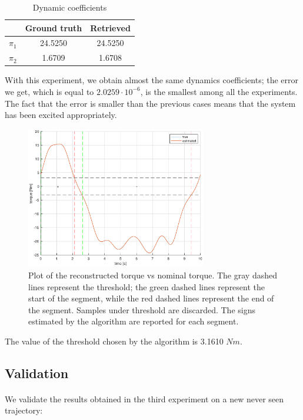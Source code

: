 \documentclass{article}
\begin{document}
\begin{table}[!htbp]
\centering
\begin{tabular}{|c|cc|}
\hline
& Ground truth & Retrieved\\
\hline
$\pi_1$ & 24.5250 & 24.5250\\ 
$\pi_2$ & 1.6709 & 1.6708\\
\hline
\end{tabular}
\caption{Dynamic coefficients}
\end{table}
\FloatBarrier

With this experiment, we obtain almost the same dynamics coefficients; the error we get, which is equal to $2.0259\cdot10^{-6}$, is the smallest among all the experiments.  The fact that the error is smaller than the previous cases means that the system has been excited appropriately.

\begin{figure}[!htbp]
\centering
\includegraphics[width=0.7\textwidth]{images/1-dof/results3.eps}
\caption{Plot of the reconstructed torque vs nominal torque. The gray dashed lines represent the threshold; the green dashed lines represent the start of the segment, while the red dashed lines represent the end of the segment. Samples under threshold are discarded. The signs estimated by the algorithm are reported for each segment.}
\end{figure}
\FloatBarrier

The value of the threshold chosen by the algorithm is 3.1610 $Nm$.

\pagebreak

\subsection{Validation} \paragraph{} We validate the results obtained in the third experiment on a new never seen trajectory:
\end{document}
